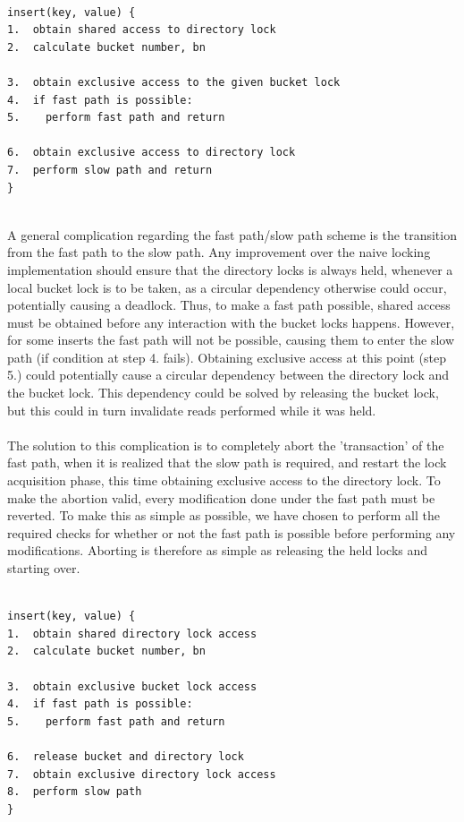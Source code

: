\documentclass[11pt]{article} %
\begin{document}
\\
\begin{fminipage}{\linewidth}
\begin{lstlisting}[]
insert(key, value) {
1.  obtain shared access to directory lock
2.  calculate bucket number, bn

3.  obtain exclusive access to the given bucket lock 
4.  if fast path is possible:
5.    perform fast path and return
 
6.  obtain exclusive access to directory lock
7.  perform slow path and return
}
\end{lstlisting}
\end{fminipage}
\vphantom{fill}\\
A general complication regarding the fast path/slow path scheme is the transition from the fast path to the slow path. Any improvement over the naive locking implementation should ensure that the directory locks is always held, whenever a local bucket lock is to be taken, as a circular dependency otherwise could occur, potentially causing a deadlock. Thus, to make a fast path possible, shared access must be obtained before any interaction with the bucket locks happens. However, for some inserts the fast path will not be possible, causing them to enter the slow path (if condition at step 4. fails). Obtaining exclusive access at this point (step 5.) could potentially cause a circular dependency between the directory lock and the bucket lock. This dependency could be solved by releasing the bucket lock, but this could in turn invalidate reads performed while it was held.\\
\\
The solution to this complication is to completely abort the 'transaction' of the fast path, when it is realized that the slow path is required, and restart the lock acquisition phase, this time obtaining exclusive access to the directory lock. To make the abortion valid, every modification done under the fast path must be reverted. To make this as simple as possible, we have chosen to perform all the required checks for whether or not the fast path is possible before performing any modifications. Aborting is therefore as simple as releasing the held locks and starting over.\\
\\
\noindent
\begin{fminipage}{\linewidth}
\begin{lstlisting}[]
insert(key, value) {
1.  obtain shared directory lock access
2.  calculate bucket number, bn

3.  obtain exclusive bucket lock access
4.  if fast path is possible:
5.    perform fast path and return

6.  release bucket and directory lock
7.  obtain exclusive directory lock access
8.  perform slow path
}
\end{lstlisting}
\end{fminipage}
\end{document}
